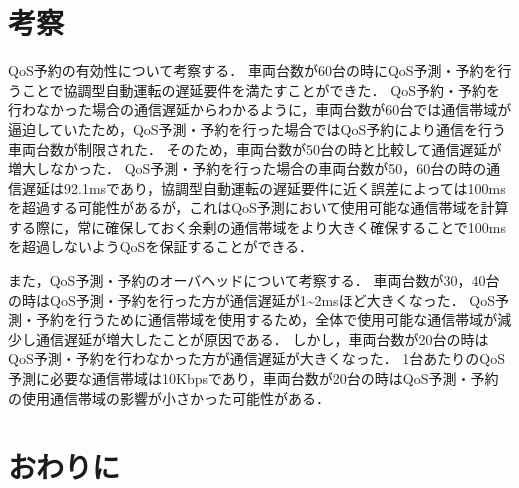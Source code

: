 \documentclass[a4paper,11pt,uplatex]{ujreport}
\begin{document}




\chapter{考察}
\label{chap:考察}

  QoS予約の有効性について考察する．
  車両台数が60台の時にQoS予測・予約を行うことで協調型自動運転の遅延要件を満たすことができた．
  QoS予約・予約を行わなかった場合の通信遅延からわかるように，車両台数が60台では通信帯域が逼迫していたため，QoS予測・予約を行った場合ではQoS予約により通信を行う車両台数が制限された．
  そのため，車両台数が50台の時と比較して通信遅延が増大しなかった．
  QoS予測・予約を行った場合の車両台数が50，60台の時の通信遅延は92.1msであり，協調型自動運転の遅延要件に近く誤差によっては100msを超過する可能性があるが，これはQoS予測において使用可能な通信帯域を計算する際に，常に確保しておく余剰の通信帯域をより大きく確保することで100msを超過しないようQoSを保証することができる．
  \par
  また，QoS予測・予約のオーバヘッドについて考察する．
  車両台数が30，40台の時はQoS予測・予約を行った方が通信遅延が1\textasciitilde2msほど大きくなった．
  QoS予測・予約を行うために通信帯域を使用するため，全体で使用可能な通信帯域が減少し通信遅延が増大したことが原因である．
  しかし，車両台数が20台の時はQoS予測・予約を行わなかった方が通信遅延が大きくなった．
  1台あたりのQoS予測に必要な通信帯域は10Kbpsであり，車両台数が20台の時はQoS予測・予約の使用通信帯域の影響が小さかった可能性がある．\par

\chapter{おわりに}
\label{chap:おわりに}
\end{document}
